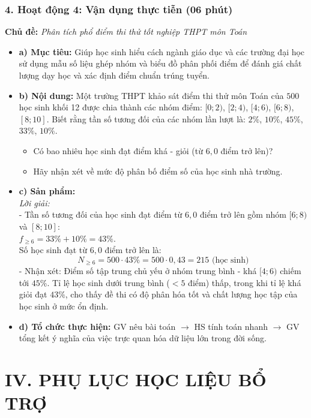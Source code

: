 \documentclass[12pt, a4paper]{article}
\begin{document}
\subsubsection*{4. Hoạt động 4: Vận dụng thực tiễn (06 phút)}
\textbf{Chủ đề:} \textit{Phân tích phổ điểm thi thử tốt nghiệp THPT môn Toán}
\begin{itemize}
    \item \textbf{a) Mục tiêu:} Giúp học sinh hiểu cách ngành giáo dục và các trường đại học sử dụng mẫu số liệu ghép nhóm và biểu đồ phân phối điểm để đánh giá chất lượng dạy học và xác định điểm chuẩn trúng tuyển.
    \item \textbf{b) Nội dung:} Một trường THPT khảo sát điểm thi thử môn Toán của $500$ học sinh khối 12 được chia thành các nhóm điểm: $[0; 2)$, $[2; 4)$, $[4; 6)$, $[6; 8)$, $[8; 10]$. Biết rằng tần số tương đối của các nhóm lần lượt là: $2\%$, $10\%$, $45\%$, $33\%$, $10\%$.
    \begin{itemize}
        \item Có bao nhiêu học sinh đạt điểm khá - giỏi (từ $6{,}0$ điểm trở lên)?
        \item Hãy nhận xét về mức độ phân bố điểm số của học sinh nhà trường.
    \end{itemize}
    \item \textbf{c) Sản phẩm:}\\
    \textit{Lời giải:}\\
    - Tần số tương đối của học sinh đạt điểm từ $6{,}0$ điểm trở lên gồm nhóm $[6; 8)$ và $[8; 10]$:\\
    $f_{\ge 6} = 33\% + 10\% = 43\%$.\\
    Số học sinh đạt từ $6{,}0$ điểm trở lên là:
    $$N_{\ge 6} = 500 \cdot 43\% = 500 \cdot 0{,}43 = 215\text{ (học sinh)}$$
    - Nhận xét: Điểm số tập trung chủ yếu ở nhóm trung bình - khá $[4; 6)$ chiếm tới $45\%$. Tỉ lệ học sinh dưới trung bình ($< 5$ điểm) thấp, trong khi tỉ lệ khá giỏi đạt $43\%$, cho thấy đề thi có độ phân hóa tốt và chất lượng học tập của học sinh ở mức ổn định.
    \item \textbf{d) Tổ chức thực hiện:} GV nêu bài toán $\to$ HS tính toán nhanh $\to$ GV tổng kết ý nghĩa của việc trực quan hóa dữ liệu lớn trong đời sống.
\end{itemize}

\newpage

\section*{IV. PHỤ LỤC HỌC LIỆU BỔ TRỢ}
\end{document}
